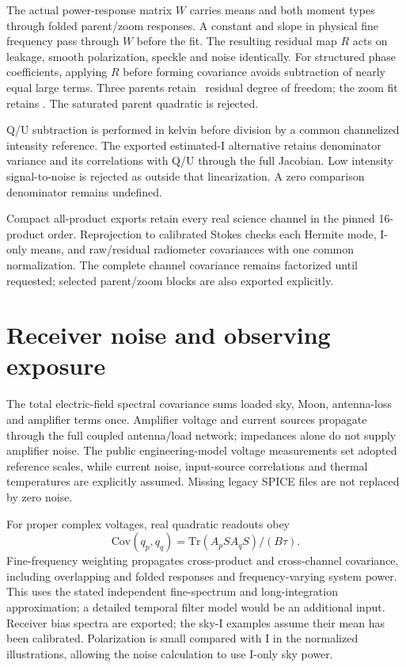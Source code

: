 \documentclass[10pt,letterpaper]{article}
\begin{document}
The actual power-response matrix $W$ carries means and both moment types
through folded parent/zoom responses. A constant and slope in physical fine
frequency pass through $W$ before the fit. The resulting residual map $R$
acts on leakage, smooth polarization, speckle and noise identically. For
structured phase coefficients, applying $R$ before forming covariance avoids
subtraction of nearly equal large terms. Three parents retain
\ParentResidualDof\ residual degree of freedom; the zoom fit retains
\ZoomResidualDof. The saturated parent quadratic is rejected.

Q/U subtraction is performed in kelvin before division by a common
channelized intensity reference. The exported estimated-I alternative
retains denominator variance and its correlations with Q/U through the
full Jacobian. Low intensity signal-to-noise is rejected as outside that
linearization. A zero comparison denominator remains undefined.




Compact all-product exports retain every real science channel in the pinned
16-product order. Reprojection to calibrated Stokes checks each Hermite
mode, I-only means, and raw/residual radiometer covariances with one common
normalization. The complete channel covariance remains factorized until
requested; selected parent/zoom blocks are also exported explicitly.

\section{Receiver noise and observing exposure}

The total electric-field spectral covariance sums loaded sky, Moon,
antenna-loss and amplifier terms once. Amplifier voltage and current
sources propagate through the full coupled antenna/load network; impedances
alone do not supply amplifier noise. The public engineering-model voltage
measurements set adopted reference scales, while current noise, input-source
correlations and thermal temperatures are explicitly assumed. Missing
legacy SPICE files are not replaced by zero noise.

For proper complex voltages, real quadratic readouts obey
\begin{equation}
 \mathrm{Cov}(q_p,q_q)=\mathrm{Tr}(A_p S A_q S)/(B\tau).
\end{equation}
Fine-frequency weighting propagates cross-product and cross-channel
covariance, including overlapping and folded responses and frequency-varying
system power. This uses the stated independent fine-spectrum and
long-integration approximation; a detailed temporal filter model would be
an additional input. Receiver bias spectra are exported; the sky-I examples
assume their mean has been calibrated. Polarization is small compared with
I in the normalized illustrations, allowing the noise calculation to use
I-only sky power.
\end{document}
